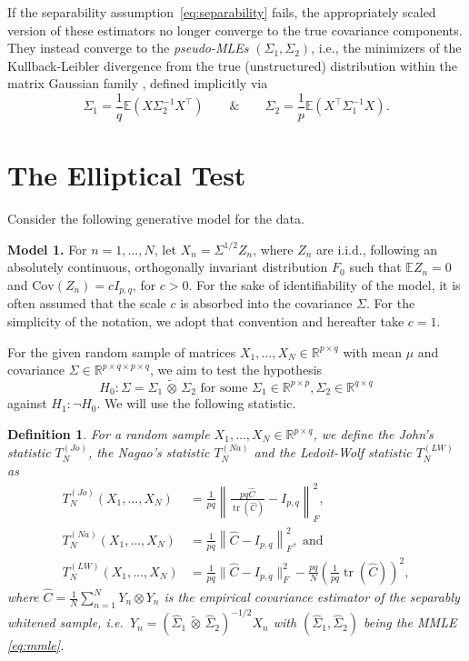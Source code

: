 \documentclass[12pt]{article}
\newcommand{\E}{\mathbb{E}}
\newcommand{\R}{\mathbb{R}}
\newcommand{\cov}{\mathrm{Cov}}
\newcommand{\tr}{\operatorname{tr}}
\newcommand{\ot}{\,\tilde\otimes\,}
\newcommand{\mmle}{\widehat \Sigma_1 \ot \widehat \Sigma_2}
\newtheorem{definition}{Definition}
\begin{document}
If the separability assumption~\eqref{eq:separability}
fails, the appropriately scaled version of these estimators no longer converge to the true covariance components. They instead converge to the \emph{pseudo-MLEs} $(\Sigma_1,\Sigma_2)$, i.e., the minimizers of the Kullback-Leibler divergence from the true (unstructured) distribution within the matrix Gaussian family \citep{white1982maximum}, defined implicitly via
\begin{equation}\label{eq:pseudo-parameter}
\Sigma_1=\frac{1}{q}\mathbb{E}(X\Sigma_2^{-1}X^\top)\qquad\&\qquad \Sigma_2=\frac{1}{p}\mathbb{E}(X^\top\Sigma_1^{-1}X).
\end{equation}



\section{The Elliptical Test}\label{sec:test}

Consider the following generative model for the data.

\smallskip
\noindent\textbf{Model 1.} For $n=1,\ldots,N$, let $X_n = \Sigma^{1/2}Z_n$, where $Z_n$ are i.i.d., following an absolutely continuous, orthogonally invariant distribution $F_0$ such that $\E Z_n=0$ and $\cov(Z_n) =c I_{p,q}$, for $c>0$. For the sake of identifiability of the model, it is often assumed that the scale $c$ is absorbed into the covariance $\Sigma$. For the simplicity of the notation, we adopt that convention and hereafter take $c=1$.
\smallskip


For the given random sample of matrices $X_1,\ldots,X_N \in \R^{p \times q}$ with mean $\mu$ and covariance $\Sigma \in \R^{p \times q \times p \times q}$, we aim to test the hypothesis
\[
H_0: \Sigma = \Sigma_1 \ot \Sigma_2 \text{ for some } \Sigma_1\in \R^{p \times p}, \Sigma_2\in \R^{q \times q}
\]
against $H_1: \neg H_0$. We will use the following statistic.

\begin{definition}\label{def:stats}
    For a random sample $X_1,\ldots,X_N \in \R^{p \times q}$, we define the John's statistic $T_N^{(Jo)}$, the Nagao's statistic $T_N^{(Na)}$ and the Ledoit-Wolf statistic $T_N^{(LW)}$ as
    \[
    \begin{split}
    T_N^{(Jo)}(X_1,\ldots,X_N) &= \frac{1}{pq} \left\| \frac{pq\widehat{C}}{\tr(\widehat C)}-I_{p,q}\right\|_F^2, \\
    T_N^{(Na)}(X_1,\ldots,X_N) &= \frac{1}{pq} \left\| \widehat{C}-I_{p,q}\right\|_F^2, \text{ and}\\
    T_N^{(LW)}(X_1,\ldots,X_N) &= \frac{1}{pq}\|\widehat{C}-I_{p,q}\|_F^2
-\frac{pq}{N}\left(\frac{1}{pq}\operatorname{tr}(\widehat{C})\right)^2,
    \end{split}
    \]
    where $\widehat{C}=\frac{1}{N} \sum_{n=1}^N Y_n \otimes Y_n$ is the empirical covariance estimator of the separably whitened sample, i.e.~$Y_n = (\mmle)^{-1/2} X_n$ with $(\widehat{\Sigma}_1,\widehat{\Sigma}_2)$ being the MMLE \eqref{eq:mmle}.
\end{definition}
\end{document}
